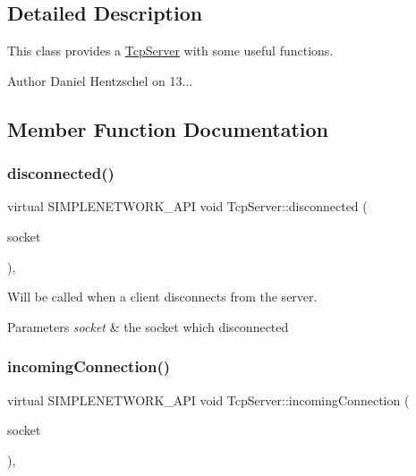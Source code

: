 \subsection{Detailed Description}
This class provides a \mbox{\hyperlink{class_tcp_server}{Tcp\+Server}} with some useful functions. 

\begin{DoxyAuthor}{Author}
Daniel Hentzschel on 13... 
\end{DoxyAuthor}


\subsection{Member Function Documentation}
\mbox{\label{class_tcp_server_a31f65254fdedc53f207906faad2445c9}} 
\subsubsection{\texorpdfstring{disconnected()}{disconnected()}}
{\footnotesize\ttfamily virtual S\+I\+M\+P\+L\+E\+N\+E\+T\+W\+O\+R\+K\+\_\+\+A\+PI void Tcp\+Server\+::disconnected (\begin{DoxyParamCaption}\item[{const \mbox{\hyperlink{class_tcp_socket}{Tcp\+Socket}} \&}]{socket }\end{DoxyParamCaption})\hspace{0.3cm}{\ttfamily [protected]}, {}}



Will be called when a client disconnects from the server. 


\begin{DoxyParams}{Parameters}
{\em socket} & the socket which disconnected \\
\hline
\end{DoxyParams}
\mbox{\label{class_tcp_server_ad6fd71a4984c07d2ca247ca0fe4e1af0}} 
\subsubsection{\texorpdfstring{incomingConnection()}{incomingConnection()}}
{\footnotesize\ttfamily virtual S\+I\+M\+P\+L\+E\+N\+E\+T\+W\+O\+R\+K\+\_\+\+A\+PI void Tcp\+Server\+::incoming\+Connection (\begin{DoxyParamCaption}\item[{const \mbox{\hyperlink{class_tcp_socket}{Tcp\+Socket}} \&}]{socket }\end{DoxyParamCaption})\hspace{0.3cm}{\ttfamily [protected]}, {}}



